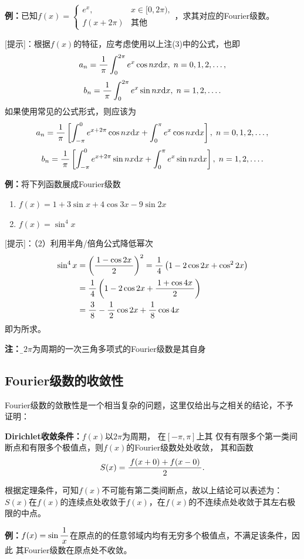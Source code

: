{\bf 例：}已知$f(x)=\left\{\begin{array}{ll}
	e^x,& x\in[0,2\pi),\\ f(x+2\pi)& \mbox{其他}
\end{array}\right.$，求其对应的Fourier级数。

[提示]：根据$f(x)$的特征，应考虑使用以上注(3)中的公式，也即
$$a_n=\displaystyle\frac{\,{1}\,}{\,{\pi}\,}\displaystyle\int_{0}^{2\pi}e^x\cos nx\mathrm{d} x,\; n=0,1,2,\ldots,$$
$$b_n=\displaystyle\frac{\,{1}\,}{\,{\pi}\,}\displaystyle\int_{0}^{2\pi}e^x\sin nx\mathrm{d} x,\; n=1,2,\ldots.$$
如果使用常见的公式形式，则应该为
$$a_n=\displaystyle\frac{\,{1}\,}{\,{\pi}\,}\left[\displaystyle\int_{-\pi}^{0}e^{x+2\pi}\cos nx\mathrm{d} x+
\displaystyle\int_{0}^{\pi}e^x\cos nx\mathrm{d} x\right],\; n=0,1,2,\ldots,$$
$$b_n=\displaystyle\frac{\,{1}\,}{\,{\pi}\,}\left[\displaystyle\int_{-\pi}^{0}e^{x+2\pi}\sin nx\mathrm{d} x+
\displaystyle\int_{0}^{\pi}e^x\sin nx\mathrm{d} x\right],\; n=1,2,\ldots.$$

{\bf 例：}将下列函数展成Fourier级数
\begin{enumerate}[(1)]
  \setlength{\itemindent}{1cm}
  \item $f(x)=1+3\sin x+4\cos 3x-9\sin 2x$
  \item $f(x)=\sin^4x$
\end{enumerate}

[提示]：（2）利用半角/倍角公式降低幂次
\begin{align*}
	\sin^4x&=\left(\displaystyle\frac{\,{1-\cos2x}\,}{\,{2}\,}\right)^2
	=\displaystyle\frac{\,{1}\,}{\,{4}\,}\left(1-2\cos2x+\cos^22x\right)\\
	&=\displaystyle\frac{\,{1}\,}{\,{4}\,}\left(1-2\cos2x+\displaystyle\frac{\,{1+\cos4x}\,}{\,{2}\,}\right)\\
	&=\displaystyle\frac{\,{3}\,}{\,{8}\,}-\displaystyle\frac{\,{1}\,}{\,{2}\,}\cos2x+\displaystyle\frac{\,{1}\,}{\,{8}\,}\cos4x
\end{align*}
即为所求。

{\bf 注：}{\b 以$2\pi$为周期的一次三角多项式的Fourier级数是其自身}

\subsection{Fourier级数的收敛性}

Fourier级数的敛散性是一个相当复杂的问题，这里仅给出与之相关的结论，不予证明：

\begin{thx}
	{\bf Dirichlet收敛条件：}$f(x)$以$2\pi$为周期， 在$[-\pi,\pi]$上其
	仅有有限多个第一类间断点和有限多个极值点，则$f(x)$的Fourier级数处处收敛，
	 其和函数
	$$S(x) =\displaystyle\frac{\,{f(x+0)+f(x-0)}\,}{\,{2}\,}.$$
\end{thx}

根据定理条件，可知$f(x)$不可能有第二类间断点，故以上结论可以表述为：
$S(x)$在$f(x)$的连续点处收敛于$f(x)$，在$f(x)$的不连续点处收敛于其左右极限的中点。

{\bf 例：}$f(x)=\sin\displaystyle\frac{\,{1}\,}{\,{x}\,}$在原点的的任意邻域内均有无穷多个极值点，不满足该条件，因此
其Fourier级数在原点处不收敛。


